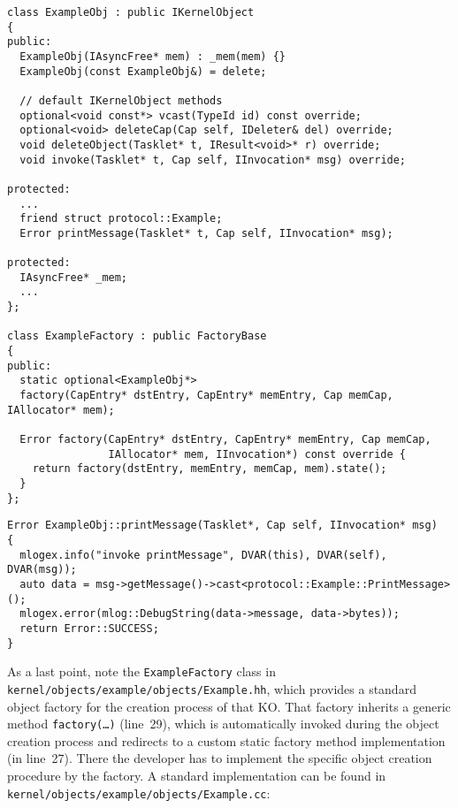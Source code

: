 \lstset{language=c++,caption=Kernel Object's Declaration,label=lst:obj-decl}
\begin{lstlisting}
class ExampleObj : public IKernelObject
{
public:
  ExampleObj(IAsyncFree* mem) : _mem(mem) {}
  ExampleObj(const ExampleObj&) = delete;

  // default IKernelObject methods
  optional<void const*> vcast(TypeId id) const override;
  optional<void> deleteCap(Cap self, IDeleter& del) override;
  void deleteObject(Tasklet* t, IResult<void>* r) override;
  void invoke(Tasklet* t, Cap self, IInvocation* msg) override;

protected:
  ...
  friend struct protocol::Example;
  Error printMessage(Tasklet* t, Cap self, IInvocation* msg);

protected:
  IAsyncFree* _mem;
  ...
};

class ExampleFactory : public FactoryBase
{
public:
  static optional<ExampleObj*>
  factory(CapEntry* dstEntry, CapEntry* memEntry, Cap memCap, IAllocator* mem);

  Error factory(CapEntry* dstEntry, CapEntry* memEntry, Cap memCap,
                IAllocator* mem, IInvocation*) const override {
    return factory(dstEntry, memEntry, memCap, mem).state();
  }
};
\end{lstlisting}


\lstset{language=c++,caption=Kernel Object's Method
Implementation,label=lst:obj-impl}
\begin{lstlisting}
Error ExampleObj::printMessage(Tasklet*, Cap self, IInvocation* msg)
{
  mlogex.info("invoke printMessage", DVAR(this), DVAR(self), DVAR(msg));
  auto data = msg->getMessage()->cast<protocol::Example::PrintMessage>();
  mlogex.error(mlog::DebugString(data->message, data->bytes));
  return Error::SUCCESS;
}
\end{lstlisting}

As a last point, note the \texttt{ExampleFactory} class in
\\\texttt{kernel/objects/example/objects/Example.hh}, which provides a standard
object factory for the creation process of that KO. That factory inherits a
generic method \texttt{factory(\ldots)} (line~29), which is automatically
invoked during the object creation process and redirects to a custom static factory method
implementation (in line~27). There the developer has to implement the specific 
object creation procedure by the factory. A standard implementation can be
found in \texttt{kernel/objects/example/objects/Example.cc}:
 
